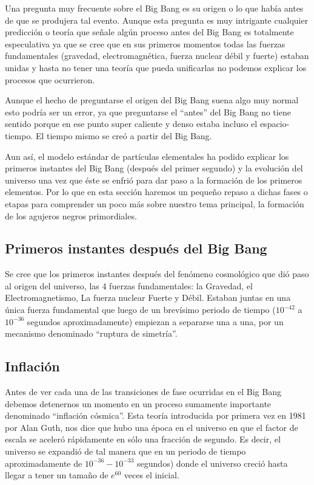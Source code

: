 \documentclass{article}
\begin{document}
Una pregunta muy frecuente sobre el Big Bang es su origen o lo que hab\'ia antes de que se produjera tal evento. Aunque esta pregunta es muy intrigante cualquier predicci\'on o teor\'ia que se\~nale alg\'un proceso antes del Big Bang es totalmente especulativa ya que se cree que en sus primeros momentos todas las fuerzas fundamentales (gravedad, electromagn\'etica, fuerza nuclear d\'ebil y fuerte) estaban unidas y hasta no tener una teor\'ia que pueda unificarlas no podemos explicar los procesos que ocurrieron.

 Aunque el hecho de preguntarse el origen del Big Bang suena algo muy normal esto podr\'ia ser un error, ya que preguntarse el ``antes'' del Big Bang no tiene sentido porque en ese punto super caliente y denso estaba incluso el espacio-tiempo. El tiempo mismo se cre\'o a partir del Big Bang.
 
Aun as\'i, el modelo est\'andar de part\'iculas elementales ha podido explicar los primeros instantes del Big Bang (despu\'es del primer segundo) y la evoluci\'on del universo una vez que \'este se enfri\'o para dar paso a la formaci\'on de los primeros elementos. Por lo que en esta secci\'on haremos un peque\~no repaso a dichas fases o etapas para comprender un poco m\'as sobre nuestro tema principal, la formaci\'on de los agujeros negros primordiales.

\subsection*{Primeros instantes despu\'es del Big Bang}
Se cree que los primeros instantes despu\'es del fen\'omeno cosmol\'ogico que di\'o paso al origen del universo, las 4 fuerzas fundamentales: la Gravedad, el Electromagnetismo, La fuerza nuclear Fuerte y D\'ebil. Estaban juntas en una \'unica fuerza fundamental que luego de un brev\'isimo periodo de tiempo ($10^{-42}$  a $10^{-36}$ segundos aproximadamente) empiezan a separarse una a una, por un mecanismo denominado ``ruptura de simetr\'ia''. 

\subsection*{Inflaci\'on}
Antes de ver cada una de las transiciones de fase ocurridas en el Big Bang debemos detenernos un momento en un proceso sumamente importante denominado ``inflaci\'on c\'osmica''. Esta teor\'ia introducida por primera vez en 1981 por Alan Guth, nos dice que hubo una \'epoca en el universo en que el factor de escala se aceler\'o r\'apidamente en s\'olo una fracci\'on de segundo. Es decir, el universo se expandi\'o de tal manera que en un periodo de tiempo aproximadamente de $10^{-36}-10^{-33}$ segundos) donde el universo creci\'o hasta llegar a tener un tama\~{n}o de $e^{60}$ veces el inicial.
\end{document}
